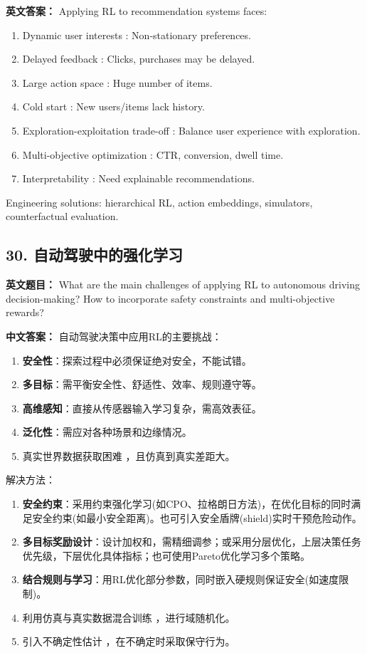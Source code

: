 \documentclass[10pt,a4paper]{ctexart}
\begin{document}
\textbf{英文答案：}  
Applying RL to recommendation systems faces:
\begin{enumerate}
    \item Dynamic user interests : Non-stationary preferences.
    \item Delayed feedback : Clicks, purchases may be delayed.
    \item Large action space : Huge number of items.
    \item Cold start : New users/items lack history.
    \item Exploration-exploitation trade-off : Balance user experience with exploration.
    \item Multi-objective optimization : CTR, conversion, dwell time.
    \item Interpretability : Need explainable recommendations.
\end{enumerate}

Engineering solutions: hierarchical RL, action embeddings, simulators, counterfactual evaluation.

\subsection*{30. 自动驾驶中的强化学习}
\textbf{英文题目：} What are the main challenges of applying RL to autonomous driving decision-making? How to incorporate safety constraints and multi-objective rewards?

\textbf{中文答案：}  
自动驾驶决策中应用RL的主要挑战：
\begin{enumerate}
    \item \textbf{安全性}：探索过程中必须保证绝对安全，不能试错。
    \item \textbf{多目标}：需平衡安全性、舒适性、效率、规则遵守等。
    \item \textbf{高维感知}：直接从传感器输入学习复杂，需高效表征。
    \item \textbf{泛化性}：需应对各种场景和边缘情况。
    \item 真实世界数据获取困难 ，且仿真到真实差距大。
\end{enumerate}

解决方法：
\begin{enumerate}
    \item \textbf{安全约束}：采用约束强化学习(如CPO、拉格朗日方法)，在优化目标的同时满足安全约束(如最小安全距离)。也可引入安全盾牌(shield)实时干预危险动作。
    \item \textbf{多目标奖励设计}：设计加权和，需精细调参；或采用分层优化，上层决策任务优先级，下层优化具体指标；也可使用Pareto优化学习多个策略。
    \item \textbf{结合规则与学习}：用RL优化部分参数，同时嵌入硬规则保证安全(如速度限制)。
    \item 利用仿真与真实数据混合训练 ，进行域随机化。
    \item 引入不确定性估计 ，在不确定时采取保守行为。
\end{enumerate}
\end{document}
